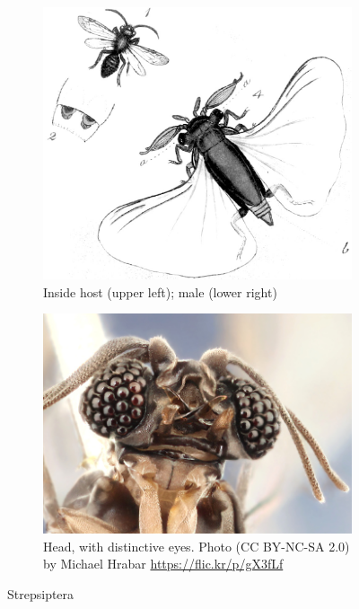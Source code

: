 \documentclass[letterpaper, 11pt]{article}
\begin{document}
\begin{figure}[ht!]
  \centering
\begin{subfigure}[ht!]{0.5\textwidth}
    \includegraphics[width=\textwidth]{Strepsiptera1}
  \caption{Inside host (upper left); male (lower right) \citep[Plate 45 in][]{bhl91785}}
  \label{fig:strep1}
\end{subfigure}
    \hfill
\begin{subfigure}[ht!]{0.4\textwidth}
    \includegraphics[width=\textwidth]{StrepsipteraHead}
  \caption{Head, with distinctive eyes. Photo (CC BY-NC-SA 2.0) by Michael Hrabar \url{https://flic.kr/p/gX3fLf}}
  \label{fig:strep2}
\end{subfigure}
    \caption{Strepsiptera}\label{fig:strepsipterans}
\end{figure}
\end{document}
